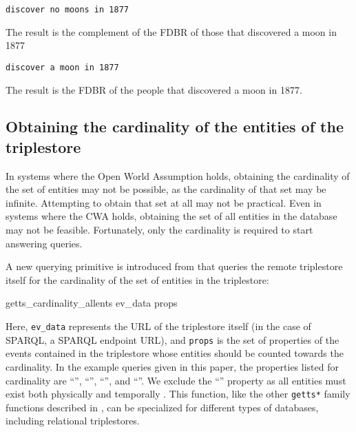 \documentclass[../main.tex]{subfiles}
\begin{document}
\begin{refsection}
\examplespacing

\texttt{discover no moons in 1877}

\examplespacing

\noindent The result is the complement of the FDBR of those that discovered a moon in 1877

\examplespacing

\texttt{discover a moon in 1877}

\examplespacing

\noindent The result is the FDBR of the people that discovered a moon in 1877.

\subsection{Obtaining the cardinality of the entities of the triplestore}

In systems where the Open World Assumption holds, obtaining the cardinality of the set of entities
may not be possible, as the cardinality of that set may be infinite.  Attempting to obtain that set at all may not be practical.  Even in systems where the CWA holds, obtaining the set of all entities in the database may not be feasible.  Fortunately, only the cardinality is required to start answering queries.

A new querying primitive is introduced from \cite{peelar2020webistjournal} that queries the remote triplestore itself for the cardinality of the set of entities in the triplestore:
\begin{code}
    getts_cardinality_allents ev_data props
\end{code}
Here, \texttt{ev\_data} represents the URL of the triplestore itself (in the case of SPARQL, a SPARQL endpoint URL), and \texttt{props} is the set of properties of the events contained in the triplestore whose entities should be counted towards the cardinality.  In the example queries given in this paper, the properties listed for cardinality are ``'', ``'', ``'', and ``''.  We exclude the ``'' property as all entities must exist both physically and temporally \cite{w3csemanticweb}.  This function, like the other  \texttt{getts*} family functions described in \cite{frostpeelar2019}, can be specialized for different types of databases, including relational triplestores.


\end{refsection}
\end{document}

